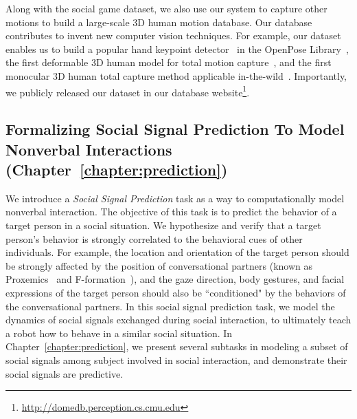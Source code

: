 Along with the social game dataset, we also use our system to capture other motions to build a large-scale 3D human motion database. Our database contributes to invent new computer vision techniques. For example, our dataset enables us to build a popular hand keypoint detector~\cite{simon2017hand} in the OpenPose Library~\cite{openpose}, the first deformable 3D human model for total motion capture~\cite{joo2018}, and the first monocular 3D human total capture method applicable in-the-wild~\cite{Xiang2019}. Importantly, we publicly released our dataset in our database website\footnote{\url{http://domedb.perception.cs.cmu.edu}}.

\subsection{Formalizing Social Signal Prediction To Model Nonverbal Interactions  (Chapter~\ref{chapter:prediction})}

We introduce a \emph{Social Signal Prediction} task as a way to computationally model nonverbal interaction. The objective of this task is to predict the behavior of a target person in a social situation. We hypothesize and verify that a target person's behavior is strongly correlated to the behavioral cues of other individuals. For example, the location and orientation of the target person should be strongly affected by the position of conversational partners (known as Proxemics~\cite{Hall66} and F-formation~\cite{kendon90}), and the gaze direction, body gestures, and facial expressions of the target person should also be ``conditioned" by the behaviors of the conversational partners. In this social signal prediction task, we model the dynamics of social signals exchanged during social interaction, to ultimately teach a robot how to behave in a similar social situation. In Chapter~\ref{chapter:prediction}, we present several subtasks in modeling a subset of social signals among subject involved in social interaction, and demonstrate their social signals are predictive. %

